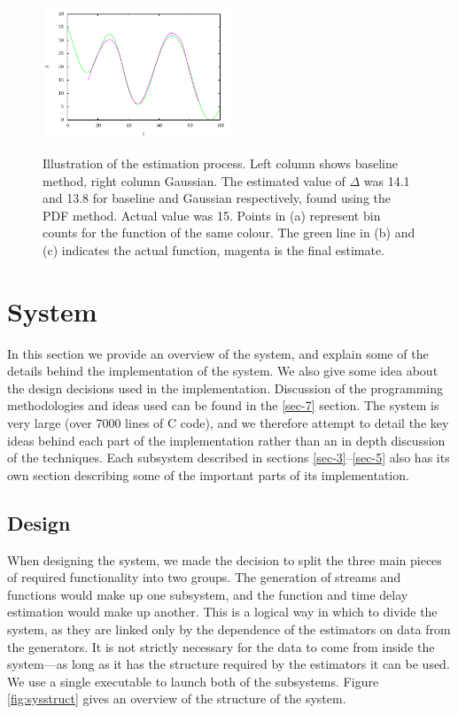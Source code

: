 \documentclass[a4paper,11pt]{article}
\begin{document}
\begin{figure}[h!]
{   \includegraphics[width=0.5\textwidth]{images/gausscomb}
   }
   \caption{Illustration of the estimation process. Left column shows baseline
   method, right column Gaussian. The estimated value of $\Delta$ was 14.1 and
   13.8 for baseline and Gaussian respectively, found using the PDF
   method. Actual value was 15.  Points in (a) represent bin counts for the
   function of the same colour. The green line in (b) and (c) indicates the actual function,
   magenta is the final estimate.}
   \label{fig:finest}
   \end{figure}
\section{System}
\label{sec-6}

  In this section we provide an overview of the system, and explain some of the
  details behind the implementation of the system. We also give some idea about
  the design decisions used in the implementation. Discussion of the programming
  methodologies and ideas used can be found in the \ref{sec-7} section. The
  system is very large (over 7000 lines of C code), and we therefore attempt to
  detail the key ideas behind each part of the implementation rather than an in
  depth discussion of the techniques. Each subsystem described in sections
  \ref{sec-3}--\ref{sec-5} also has its own section
  describing some of the important parts of its implementation.
\subsection{Design}
\label{sec-6-1}

   When designing the system, we made the decision to split the three main
   pieces of required functionality into two groups. The generation of streams
   and functions would make up one subsystem, and the function and time delay
   estimation would make up another. This is a logical way in which to divide
   the system, as they are linked only by the dependence of the estimators on
   data from the generators. It is not strictly necessary for the data to come
   from inside the system---as long as it has the structure required by the
   estimators it can be used. We use a single executable to launch both of the
   subsystems. Figure \ref{fig:sysstruct} gives an overview of the structure of
   the system.
\end{document}
